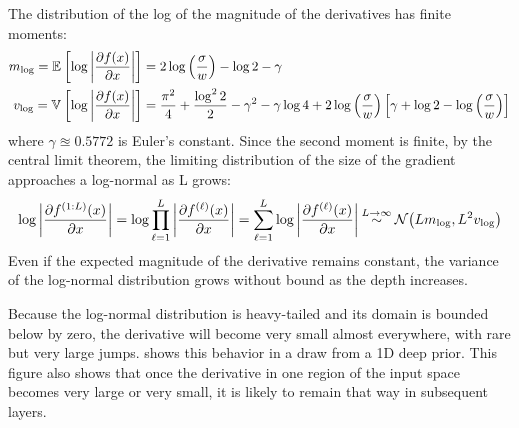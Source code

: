 \documentclass{article} %
\begin{document}
The distribution of the log of the magnitude of the derivatives has finite moments:
%
\begin{align}
m_{\log} = \mathbb{E}_{} \left[ {\log \left| \frac{\partial f(x)}{\partial x} \right|} \right] & = 2 \log \left( \frac{\sigma}{w} \right) - \log2 - \gamma \nonumber \\
v_{\log} = \mathbb{V}_{} \left[ {\log \left| \frac{\partial f(x)}{\partial x} \right|} \right] & = \frac{\pi^2}{4} + \frac{\log^2 2}{2}  - \gamma^2 - \gamma \log4 + 2 \log\left(\frac{\sigma}{w}\right) \left[ \gamma + \log2 - \log \left(\frac{\sigma}{w}\right) \right]
\end{align}
%
where $\gamma \approxeq 0.5772$ is Euler's constant.  Since the second moment is finite, by the central limit theorem, the limiting distribution of the size of the gradient approaches a log-normal as L grows:
%
\begin{align}
\log \left| \frac{\partial f^{(1:L)}(x)}{\partial x} \right| 
 = \log \prod_{\ell=1}^L \left| \frac{\partial f^{(\ell)}(x)}{\partial x} \right| 
 = \sum_{\ell=1}^L \log \left| \frac{\partial f^{(\ell)}(x)}{\partial x} \right| 
\mathbin{\overset{L \rightarrow \infty}{\sim}} \mathcal{N}\!\left( L m_{\log} ,L^2 v_{\log}\right)
\end{align}
%
Even if the expected magnitude of the derivative remains constant, the variance of the log-normal distribution grows without bound as the depth increases.

Because the log-normal distribution is heavy-tailed and its domain is bounded below by zero, the derivative will become very small almost everywhere, with rare but very large jumps.  
 shows this behavior in a draw from a 1D deep \gp{} prior.
This figure also shows that once the derivative in one region of the input space becomes very large or very small, it is likely to remain that way in subsequent layers.
%
\end{document}

